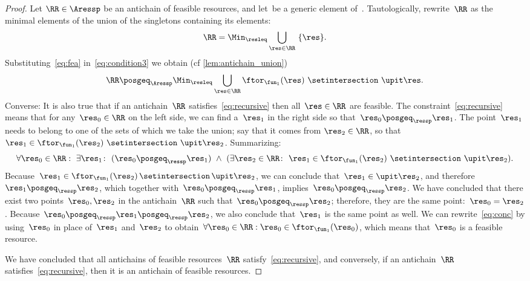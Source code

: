 \begin{proof}
	Let $\RR\in\Aressp$ be an antichain of feasible resources, and let~\res be a generic element of~\ressp.
	Tautologically, rewrite~$\RR$ as the minimal elements of the union of the singletons containing its elements:
	\begin{equation}
		\RR=\Min_{\resleq}\bigcup_{\res\in\RR}\ \{\res\}.
		\label{eq:condition3}
	\end{equation}
	Substituting~\cref{eq:fea} in~\cref{eq:condition3} we obtain (cf
	\cref{lem:antichain_union})
	\begin{equation}
		\RR\posgeq_{\Aressp}\Min_{\resleq}\bigcup_{\res\in\RR}\ftor_{\fun_{1}}(\res)\ \setintersection\ \upit\res.
		\label{eq:recursive}
	\end{equation}
	Converse: It is also true that if an antichain~$\RR$ satisfies~\cref{eq:recursive} then all~$\res\in\RR$ are feasible.
	The constraint~\cref{eq:recursive} means that for any~$\res_{0}\in\RR$ on the left side, we can find a~$\res_{1}$ in the right side so that~$\res_{0}\posgeq_{\ressp}\res_{1}$.
	The point~$\res_{1}$ needs to belong to one of the sets of which we take the union; say that it comes from $\res_{2}\in\RR$, so that $\res_{1}\in\ftor_{\fun_{1}}(\res_{2})\ \setintersection\ \upit\res_{2}$.
	Summarizing:
	\begin{equation}
		\forall\res_{0}\in\RR:\ \exists\res_{1}\colon\ (\res_{0}\posgeq_{\ressp}\res_{1})\ \wedge\ (\exists\res_{2}\in\RR\colon\ \res_{1}\in\ftor_{\fun_{1}}(\res_{2})\ \setintersection\ \upit\res_{2}).
		\label{eq:conc}
	\end{equation}
	Because~$\res_{1}\in\ftor_{\fun_{1}}(\res_{2})\,\setintersection\,\upit\res_{2}$, we can conclude that~$\res_{1}\in\upit\res_{2}$, and therefore~$\res_{1}\posgeq_{\ressp}\res_{2}$, which together with~$\res_{0}\posgeq_{\ressp}\res_{1}$, implies~$\res_{0}\posgeq_{\ressp}\res_{2}$.
	We have concluded that there exist two points~$\res_{0},\res_{2}$ in the antichain~$\RR$ such that~$\res_{0}\posgeq_{\ressp}\res_{2}$; therefore, they are the same point:~$\res_{0}=\res_{2}$.
	Because~$\res_{0}\posgeq_{\ressp}\res_{1}\posgeq_{\ressp}\res_{2}$, we also conclude that~$\res_{1}$ is the same point as well.
	We can rewrite~\cref{eq:conc} by using~$\res_{0}$ in place of~$\res_{1}$ and~$\res_{2}$ to obtain~$\forall\res_{0}\in\RR:\res_{0}\in\ftor_{\fun_{1}}(\res_{0})$,
	which means that~$\res_{0}$ is a feasible resource.

	We have concluded that all antichains of feasible resources~$\RR$ satisfy~\cref{eq:recursive}, and conversely, if an antichain~$\RR$ satisfies~\cref{eq:recursive}, then it is an antichain of feasible resources.


\end{proof}
